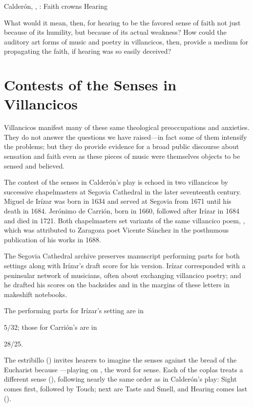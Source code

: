 \begin{expoem}
\caption{Calderón, , : Faith crowns Hearing}
\label{expoem:Calderon-Retiro-Hearing}
\end{expoem}

What would it mean, then, for hearing to be the favored sense of faith not just because of its humility, but because of its actual weakness?
How could the auditory art forms of music and poetry in villancicos, then, provide a medium for propagating the faith, if hearing was so easily deceived?

\section{Contests of the Senses in Villancicos}

Villancicos manifest many of these same theological preoccupations and anxieties.
They do not answer the questions we have raised---in fact some of them intensify the problems; but they do provide evidence for a broad public discourse about sensation and faith even as these pieces of music were themselves objects to be sensed and believed.

The contest of the senses in Calderón's play is echoed in two villancicos by successive chapelmasters at Segovia Cathedral in the later seventeenth century.
Miguel de Irízar was born in 1634 and served at Segovia from 1671 until his death in 1684.
Jerónimo de Carrión, born in 1660, followed after Irízar in 1684 and died in 1721.
Both chapelmasters set variants of the same villancico poem, , which was attributed to Zaragoza poet Vicente Sánchez in the posthumous publication of his works in 1688.

The Segovia Cathedral archive preserves manuscript performing parts for both settings along with Irízar's draft score for his version.
Irízar corresponded with a peninsular network of musicians, often about exchanging villancico poetry; and he drafted his scores on the backsides and in the margins of these letters in makeshift notebooks.
  \begin{Footnote}
  The performing parts for Irízar's setting are in \signature{E-SE}{5/32}; those for Carrión's are in \signature{E-SE}{28/25}.
  \end{Footnote}

The estribillo () invites hearers to imagine the senses  against the bread of the Eucharist because ---playing on , the word for sense.
Each of the coplas treats a different sense (), following nearly the same order as in Calderón's play: 
Sight comes first, followed by Touch; next are Taste and Smell, and Hearing comes last ().


